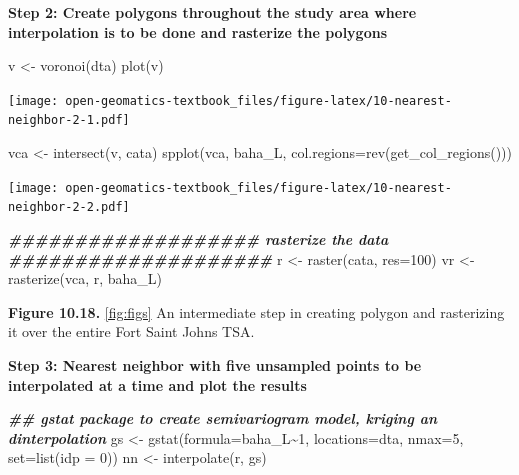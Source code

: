 \documentclass[
]{book}
\newenvironment{Shaded}{\begin{snugshade}}{\end{snugshade}}
\newcommand{\AttributeTok}[1]{\textcolor[rgb]{0.77,0.63,0.00}{#1}}
\newcommand{\DecValTok}[1]{\textcolor[rgb]{0.00,0.00,0.81}{#1}}
\newcommand{\DocumentationTok}[1]{\textcolor[rgb]{0.56,0.35,0.01}{\textbf{\textit{#1}}}}
\newcommand{\FunctionTok}[1]{\textcolor[rgb]{0.00,0.00,0.00}{#1}}
\newcommand{\NormalTok}[1]{#1}
\newcommand{\OtherTok}[1]{\textcolor[rgb]{0.56,0.35,0.01}{#1}}
\newcommand{\SpecialCharTok}[1]{\textcolor[rgb]{0.00,0.00,0.00}{#1}}
\newcommand{\StringTok}[1]{\textcolor[rgb]{0.31,0.60,0.02}{#1}}
\begin{document}
\textbf{Step 2: Create polygons throughout the study area where interpolation is to be done and rasterize the polygons}

\begin{Shaded}
\begin{Highlighting}[]
\NormalTok{v }\OtherTok{\textless{}{-}} \FunctionTok{voronoi}\NormalTok{(dta)}
\FunctionTok{plot}\NormalTok{(v)}
\end{Highlighting}
\end{Shaded}

\texttt{[image: open-geomatics-textbook\_files/figure-latex/10-nearest-neighbor-2-1.pdf]}

\begin{Shaded}
\begin{Highlighting}[]
\NormalTok{vca }\OtherTok{\textless{}{-}} \FunctionTok{intersect}\NormalTok{(v, cata)}
\FunctionTok{spplot}\NormalTok{(vca, }\StringTok{\textquotesingle{}baha\_L\textquotesingle{}}\NormalTok{, }\AttributeTok{col.regions=}\FunctionTok{rev}\NormalTok{(}\FunctionTok{get\_col\_regions}\NormalTok{()))}
\end{Highlighting}
\end{Shaded}

\texttt{[image: open-geomatics-textbook\_files/figure-latex/10-nearest-neighbor-2-2.pdf]}

\begin{Shaded}
\begin{Highlighting}[]
\DocumentationTok{\#\#\#\#\#\#\#\#\#\#\#\#\#\#\#\#\#\#\# rasterize the data \#\#\#\#\#\#\#\#\#\#\#\#\#\#\#\#\#\#\#\#}
\NormalTok{r }\OtherTok{\textless{}{-}} \FunctionTok{raster}\NormalTok{(cata, }\AttributeTok{res=}\DecValTok{100}\NormalTok{)}
\NormalTok{vr }\OtherTok{\textless{}{-}} \FunctionTok{rasterize}\NormalTok{(vca, r, }\StringTok{\textquotesingle{}baha\_L\textquotesingle{}}\NormalTok{)}
\end{Highlighting}
\end{Shaded}

\textbf{Figure 10.18.} \ref{fig:figs} An intermediate step in creating polygon and rasterizing it over the entire Fort Saint Johns TSA.

\textbf{Step 3: Nearest neighbor with five unsampled points to be interpolated at a time and plot the results}

\begin{Shaded}
\begin{Highlighting}[]
\DocumentationTok{\#\# gstat package to create semivariogram model, kriging an dinterpolation}
\NormalTok{gs }\OtherTok{\textless{}{-}} \FunctionTok{gstat}\NormalTok{(}\AttributeTok{formula=}\NormalTok{baha\_L}\SpecialCharTok{\textasciitilde{}}\DecValTok{1}\NormalTok{, }\AttributeTok{locations=}\NormalTok{dta, }\AttributeTok{nmax=}\DecValTok{5}\NormalTok{, }\AttributeTok{set=}\FunctionTok{list}\NormalTok{(}\AttributeTok{idp =} \DecValTok{0}\NormalTok{))}
\NormalTok{nn }\OtherTok{\textless{}{-}} \FunctionTok{interpolate}\NormalTok{(r, gs)}
\end{Highlighting}
\end{Shaded}
\end{document}
